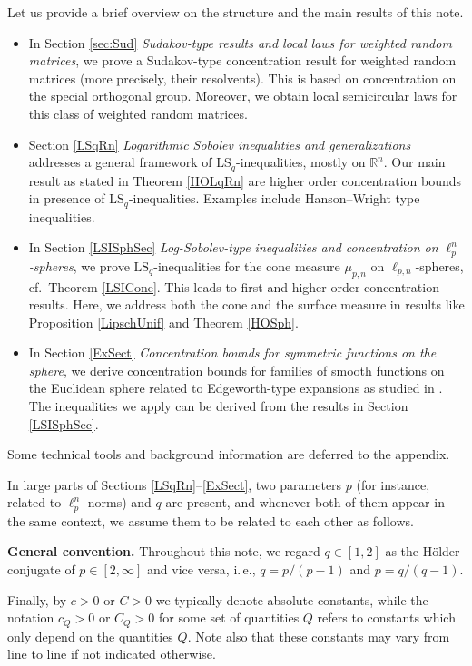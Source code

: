 \documentclass[a4paper,12pt]{amsart}
\numberwithin{equation}{section}
\theoremstyle{remark}
\def\R{{\mathbb R}}
\begin{document}
Let us provide a brief overview on the structure and the main results of this note.
\begin{itemize}
    \item In Section \ref{sec:Sud} \emph{Sudakov-type results and local laws for weighted random matrices}, we prove a Sudakov-type concentration result for weighted random matrices (more precisely, their resolvents). This is based on concentration on the special orthogonal group. Moreover, we obtain local semicircular laws for this class of weighted random matrices.
    \item Section \ref{LSqRn} \emph{Logarithmic Sobolev inequalities and generalizations} addresses a general framework of $\mathrm{LS}_q$-inequalities, mostly on $\R^n$. Our main result as stated in Theorem \ref{HOLqRn} are higher order concentration bounds in presence of $\mathrm{LS}_q$-inequalities. Examples include Hanson--Wright type inequalities.
    \item In Section \ref{LSISphSec} \emph{Log-Sobolev-type inequalities and concentration on $\ell_p^n$-spheres}, we prove $\mathrm{LS}_q$-inequalities for the cone measure $\mu_{p,n}$ on $\ell_{p,n}$-spheres, cf.\ Theorem \ref{LSICone}. This leads to first and higher order concentration results. Here, we address both the cone and the surface measure in results like Proposition \ref{LipschUnif} and Theorem \ref{HOSph}.
    \item In Section \ref{ExSect} \emph{Concentration bounds for symmetric functions on the sphere}, we derive concentration bounds for families of smooth functions on the Euclidean sphere related to Edgeworth-type expansions as studied in \cite{GNU17}. The inequalities we apply can be derived from the results in Section \ref{LSISphSec}.
\end{itemize}
Some technical tools and background information are deferred to the appendix.

In large parts of Sections \ref{LSqRn}--\ref{ExSect}, two parameters $p$ (for instance, related to $\ell_p^n$-norms) and $q$ are present, and whenever both of them appear in the same context, we assume them to be related to each other as follows.

\textbf{General convention.} Throughout this note, we regard $q \in [1,2]$ as the H\"{o}lder conjugate of $p \in [2, \infty]$ and vice versa, i.\,e., $q=p/(p-1)$ and $p=q/(q-1)$.

Finally, by $c>0$ or $C>0$ we typically denote absolute constants, while the notation $c_Q>0$ or $C_Q >0$ for some set of quantities $Q$ refers to constants which only depend on the quantities $Q$. Note also that these constants may vary from line to line if not indicated otherwise.
\end{document}
